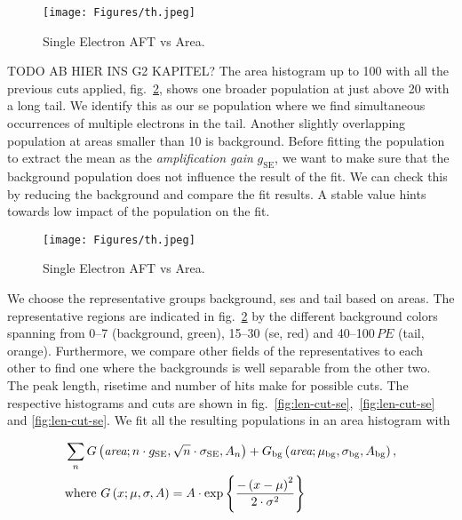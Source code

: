 \begin{figure}
    \centering
    \texttt{[image: Figures/th.jpeg]}  %
    \caption[AFT vs Area Single Electrons]{
        Single Electron AFT vs Area.
    }
    \label{fig:se-aft}
\end{figure}

TODO AB HIER INS G2 KAPITEL?
The area histogram up to \SI{100}{} with all the previous cuts applied, fig.~\ref{fig:se-area-hist}, shows one broader population at just above \SI{20}{} with a long tail.
We identify this as our \gls{se} population where we find simultaneous occurrences of multiple electrons in the tail.
Another slightly overlapping population at areas smaller than \SI{10}{} is background.
Before fitting the population to extract the mean as the \emph{amplification gain} $ g_\mathrm{SE} $, we want to make sure that the background population does not influence the result of the fit.
We can check this by reducing the background and compare the fit results.
A stable value hints towards low impact of the population on the fit.

\begin{figure}
    \centering
    \texttt{[image: Figures/th.jpeg]}  %
    \caption[Histogram Area Single Electrons and Background]{
        Single Electron AFT vs Area.
    }
    \label{fig:se-area-hist}
\end{figure}


We choose the representative groups background, \glspl{se} and tail based on areas.
The representative regions are indicated in fig.~\ref{fig:se-area-hist} by the different background colors spanning from \numrange{0}{7} (background, green), \numrange{15}{30} (\gls{se}, red) and \numrange{40}{100}$ \,\mathit{PE} $ (tail, orange).
Furthermore, we compare other fields of the representatives to each other to find one where the backgrounds is well separable from the other two.
The peak length, risetime and number of hits make for possible cuts.
The respective histograms and cuts are shown in fig.~\ref{fig:len-cut-se},~\ref{fig:len-cut-se} and \ref{fig:len-cut-se}.
We fit all the resulting populations in an area histogram with %


\begin{align}
    &\sum_{n} G \left(  \textit{area}; n \cdot g_\mathrm{SE}, \sqrt{n} \cdot \sigma_\mathrm{SE}, A_n \right) +
    G_\mathrm{bg} \left( \textit{area};  \mu_\mathrm{bg}, \sigma_\mathrm{bg}, A_\mathrm{bg} \right), \\
    &\mathrm{where~} G \left( x;  \mu, \sigma, A \right) = A \cdot \exp{ \left\{ \frac{-\left( x - \mu \right)^2}{2\cdot\sigma^2} \right\} }
    \label{eq:se-fit-model}
\end{align}


